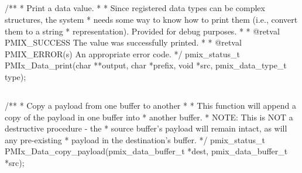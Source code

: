 \subsection{}

\cspecificstart
\begin{codepar}
/**
 * Print a data value.
 *
 * Since registered data types can be complex structures, the system
 * needs some way to know how to print them (i.e., convert them to a string
 * representation). Provided for debug purposes.
 *
 * @retval PMIX_SUCCESS The value was successfully printed.
 *
 * @retval PMIX_ERROR(s) An appropriate error code.
 */
pmix_status_t
PMIx_Data_print(char **output, char *prefix,
                void *src, pmix_data_type_t type);
\end{codepar}
\cspecificend


\subsection{}

\cspecificstart
\begin{codepar}
/**
 * Copy a payload from one buffer to another
 *
 * This function will append a copy of the payload in one buffer into
 * another buffer.
 * NOTE: This is NOT a destructive procedure - the
 * source buffer's payload will remain intact, as will any pre-existing
 * payload in the destination's buffer.
 */
pmix_status_t
PMIx_Data_copy_payload(pmix_data_buffer_t *dest,
                       pmix_data_buffer_t *src);
\end{codepar}
\cspecificend


